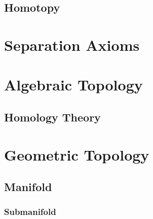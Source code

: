 \subsection{Homotopy}\label{sec:homotopy}



\section{Separation Axioms}\label{sec:separation_axioms}



\section{Algebraic Topology}\label{sec:algebraic_topology}

\subsection{Homology Theory}\label{sec:homology_theory}



\section{Geometric Topology}\label{sec:geometric_topology}

\subsection{Manifold}\label{sec:manifold}

\subsubsection{Submanifold}\label{sec:submanifold}



